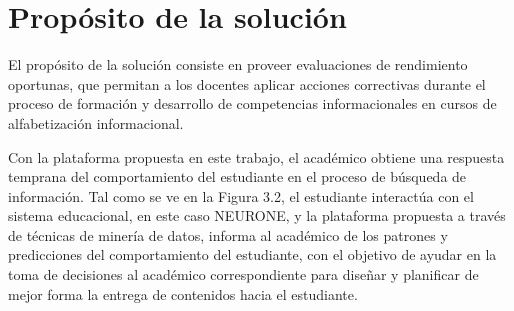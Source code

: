 \section{Propósito de la solución}
\label{sec:proposito-solucion}
El propósito de la solución consiste en proveer evaluaciones de rendimiento oportunas, que permitan a los docentes aplicar acciones correctivas durante el proceso de formación y desarrollo de competencias informacionales en cursos de alfabetización informacional.

Con la plataforma propuesta en este trabajo, el académico obtiene una respuesta temprana del comportamiento del estudiante en el proceso de búsqueda de información. Tal como se ve en la Figura 3.2, el estudiante interactúa con el sistema educacional, en este caso NEURONE, y la plataforma propuesta a través de técnicas de minería de datos, informa al académico de los patrones y predicciones del comportamiento del estudiante, con el objetivo de ayudar en la toma de decisiones al académico correspondiente para diseñar y planificar de mejor forma la entrega de contenidos hacia el estudiante.